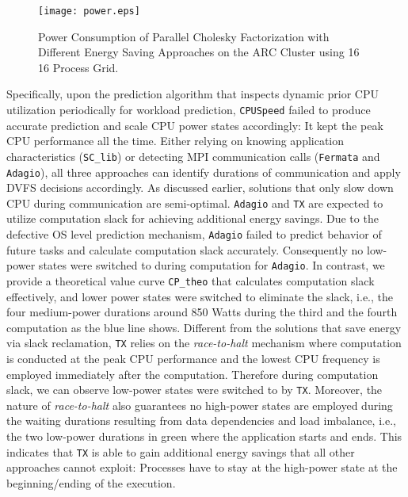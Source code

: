 \documentclass[12pt]{elsarticle}
\begin{document}
\begin{figure}\centering
\texttt{[image: power.eps]}\caption{Power Consumption of Parallel Cholesky Factorization with Different Energy Saving Approaches on the ARC Cluster using 16  16 Process Grid.}
\label{power_efficiency_arc}
\end{figure}

Specifically, upon the prediction algorithm that inspects dynamic prior CPU utilization periodically for workload prediction, \texttt{CPUSpeed} failed to produce accurate prediction and scale CPU power states accordingly: It kept the peak CPU performance all the time. Either relying on knowing application characteristics (\texttt{SC\_lib}) or detecting MPI communication calls (\texttt{Fermata} and \texttt{Adagio}), all three approaches can identify durations of communication and apply DVFS decisions accordingly. As discussed earlier, solutions that only slow down CPU during communication are semi-optimal. \texttt{Adagio} and \texttt{TX} are expected to utilize computation slack for achieving additional energy savings. Due to the defective OS level prediction mechanism, \texttt{Adagio} failed to predict behavior of future tasks and calculate computation slack accurately. Consequently no low-power states were switched to during computation for \texttt{Adagio}. In contrast, we provide a theoretical value curve \texttt{CP\_theo} that calculates computation slack effectively, and lower power states were switched to eliminate the slack, i.e., the four medium-power durations around 850 Watts during the third and the fourth computation as the blue line shows. Different from the solutions that save energy via slack reclamation, \texttt{TX} relies on the \emph{race-to-halt} mechanism where computation is conducted at the peak CPU performance and the lowest CPU frequency is employed immediately after the computation. Therefore during computation slack, we can observe low-power states were switched to by \texttt{TX}. Moreover, the nature of \emph{race-to-halt} also guarantees no high-power states are employed during the waiting durations resulting from data dependencies and load imbalance, i.e., the two low-power durations in green where the application starts and ends. This indicates that \texttt{TX} is able to gain additional energy savings that all other approaches cannot exploit: Processes have to stay at the high-power state at the beginning/ending of the execution.
\end{document}
